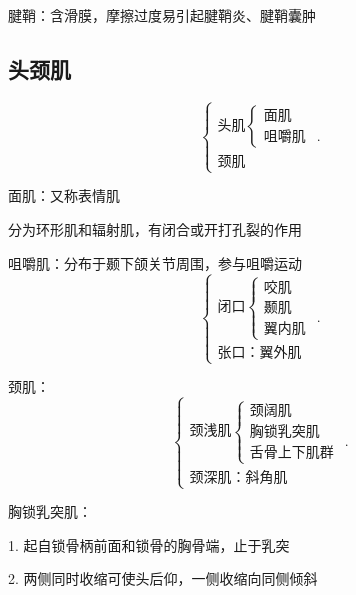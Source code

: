 \begin{notation}
    腱鞘：含滑膜，摩擦过度易引起腱鞘炎、腱鞘囊肿
\end{notation}

\subsection{头颈肌}%
\label{sub:头颈肌}
\[
    \begin{cases}
        \text{头肌}\begin{cases}
            \text{面肌}\\
            \text{咀嚼肌}
        \end{cases}\\
        \text{颈肌}
    \end{cases}
.\] 
\begin{notation}
    面肌：又称表情肌

    分为环形肌和辐射肌，有闭合或开打孔裂的作用
\end{notation}
\begin{notation}
    咀嚼肌：分布于颞下颌关节周围，参与咀嚼运动
    \[
        \begin{cases}
            \text{闭口}
            \begin{cases}
                \text{咬肌}\\
                \text{颞肌}\\
                \text{翼内肌}
            \end{cases}\\
            \text{张口：翼外肌}
        \end{cases}
    .\] 
\end{notation}
\begin{notation}
    颈肌：
    \[
        \begin{cases}
            \text{颈浅肌}\begin{cases}
                \text{颈阔肌}\\
                \text{胸锁乳突肌}\\
                \text{舌骨上下肌群}
            \end{cases}\\
            \text{颈深肌：斜角肌}
        \end{cases}
    .\] 

    胸锁乳突肌：

    1. 起自锁骨柄前面和锁骨的胸骨端，止于乳突

    2. 两侧同时收缩可使头后仰，一侧收缩向同侧倾斜
\end{notation}
